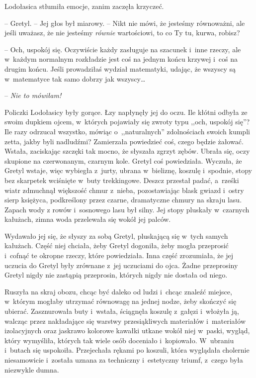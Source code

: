 \documentclass[oneside,polish,11pt,sfheadings]{mwbk}
\begin{document}
Lodołasica stłumiła emocje, zanim zaczęła krzyczeć. 

-- Gretyl. -- Jej głos
był miarowy. -- Nikt nie mówi, że jesteśmy równoważni, ale jeśli uważasz,
że nie jesteśmy \textit{równie} wartościowi, to co Ty tu, kurwa, robisz?

-- Och, uspokój się. Oczywiście każdy zasługuje na szacunek i~inne
rzeczy, ale w~każdym normalnym rozkładzie jest coś na jednym końcu
krzywej i~coś na drugim końcu. Jeśli prowadziłaś wydział matematyki,
udając, że wszyscy są w~matematyce tak samo dobrzy jak wszyscy\ldots 

-- \textit{Nie to mówiłam!}

Policzki Lodołasicy były gorące. Łzy
napłynęły jej do oczu. Ile kłótni odbyła ze swoim dupkiem ojcem, w~których pojawiały się zwroty typu ,,och, uspokój się''? Ile razy
odrzucał wszystko, mówiąc o~,,naturalnych'' zdolnościach swoich kumpli
zetta, jakby byli nadludźmi? Zamierzała powiedzieć coś, czego będzie
żałować. Wstała, zaciskając szczęki tak mocno, że słyszała zgrzyt zębów.
Ubrała się, oczy skupione na czerwonanym, czarnym kole. Gretyl coś
powiedziała. Wyczuła, że Gretyl wstaje, więc wybiegła z~jurty, ubrana w~bieliznę, koszulę i~spodnie, stopy bez skarpetek wciśnięte w~buty
trekkingowe. Deszcz przestał padać, a~rześki wiatr zdmuchnął większość
chmur z~nieba, pozostawiając blask gwiazd i~ostry sierp księżyca,
podkreślony przez czarne, dramatyczne chmury na skraju lasu. Zapach wody
z rowów i~sosnowego lasu był silny. Jej stopy pluskały w~czarnych
kałużach, zimna woda przelewała się wokół jej palców.

Wydawało jej się, że słyszy za sobą Gretyl, pluskającą się w~tych samych
kałużach. Część niej chciała, żeby Gretyl dogoniła, żeby mogła
przeprosić i~cofnąć te okropne rzeczy, które powiedziała. Inna część
zrozumiała, że jej uczucia do Gretyl były zrównane z~jej uczuciami do
ojca. Żadne przeprosiny Gretyl nigdy nie zastąpią przeprosin, których
nigdy nie dostała od niego.

Ruszyła na skraj obozu, chcąc być daleko od ludzi i~chcąc znaleźć
miejsce, w~którym mogłaby utrzymać równowagę na jednej nodze, żeby
skończyć się ubierać. Zasznurowała buty i~wstała, ściągnęła koszulę z~gałęzi i~włożyła ją, walcząc przez nakładające się warstwy
przesiąkliwych materiałów i~materiałów izolacyjnych oraz jaskrawo
kolorowe kawałki utkane wokół niej w~paski, wygląd, który wymyśliła,
których tak wiele osób doceniało i~kopiowało. W~ubraniu i~butach się
uspokoiła. Przejechała rękami po koszuli, która wyglądała cholernie
niesamowicie i~została uznana za techniczny i~estetyczny triumf, z~czego
była niezwykle dumna.
\end{document}
